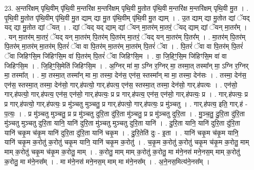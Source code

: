 \documentclass[17pt]{extarticle}
\begin{document}
23. अ॒न्तरि॑क्षम् पृथि॒वीम् पृ॑थि॒वी म॒न्तरि॑क्ष म॒न्तरि॑क्षम् पृथि॒वी मु॒तोत पृ॑थि॒वी म॒न्तरि॑क्ष म॒न्तरि॑क्षम् पृथि॒वी मु॒त । . पृ॒थि॒वी मु॒तोत पृ॑थि॒वीम् पृ॑थि॒वी मु॒त द्याम् द्या मु॒त पृ॑थि॒वीम् पृ॑थि॒वी मु॒त द्याम् । . उ॒त द्याम् द्या मु॒तोत द्यां ॅयद् यद् द्या मु॒तोत द्यां ॅयत् । . द्यां ॅयद् यद् द्याम् द्यां ॅयन् मा॒तर॑म् मा॒तरं॒ ॅयद् द्याम् द्यां ॅयन् मा॒तर᳚म् । . यन् मा॒तर॑म् मा॒तरं॒ ॅयद् यन् मा॒तर॑म् पि॒तर॑म् पि॒तर॑म् मा॒तरं॒ ॅयद् यन् मा॒तर॑म् पि॒तर᳚म् । . मा॒तर॑म् पि॒तर॑म् पि॒तर॑म् मा॒तर॑म् मा॒तर॑म् पि॒तरं॑ ॅवा वा पि॒तर॑म् मा॒तर॑म् मा॒तर॑म् पि॒तरं॑ ॅवा । . पि॒तरं॑ ॅवा वा पि॒तर॑म् पि॒तरं॑ ॅवा जिहिꣳसि॒म जि॑हिꣳसि॒म वा॑ पि॒तर॑म् पि॒तरं॑ ॅवा जिहिꣳसि॒म । . वा॒ जि॒हिꣳ॒॒सि॒म जि॑हिꣳसि॒म वा॑ वा जिहिꣳसि॒म । . जि॒हिꣳ॒॒सि॒मेति॑ जिहिꣳसि॒म । . अ॒ग्निर् मा॑ मा॒ ऽग्नि र॒ग्निर् मा॒ तस्मा॒त् तस्मा᳚न् मा॒ ऽग्नि र॒ग्निर् मा॒ तस्मा᳚त् । . मा॒ तस्मा॒त् तस्मा᳚न् मा मा॒ तस्मा॒ देन॑स॒ एन॑स॒ स्तस्मा᳚न् मा मा॒ तस्मा॒ देन॑सः । . तस्मा॒ देन॑स॒ एन॑स॒ स्तस्मा॒त् तस्मा॒ देन॑सो॒ गार्.ह॑पत्यो॒ गार्.ह॑पत्य॒ एन॑स॒ स्तस्मा॒त् तस्मा॒ देन॑सो॒ गार्.ह॑पत्यः । . एन॑सो॒ गार्.ह॑पत्यो॒ गार्.ह॑पत्य॒ एन॑स॒ एन॑सो॒ गार्.ह॑पत्यः॒ प्र प्र गार्.ह॑पत्य॒ एन॑स॒ एन॑सो॒ गार्.ह॑पत्यः॒ प्र । . गार्.ह॑पत्यः॒ प्र प्र गार्.ह॑पत्यो॒ गार्.ह॑पत्यः॒ प्र मु॑ञ्चतु मुञ्चतु॒ प्र गार्.ह॑पत्यो॒ गार्.ह॑पत्यः॒ प्र मु॑ञ्चतु । . गार्.ह॑पत्य॒ इति॒ गार्.ह॑ - प॒त्यः॒ । . प्र मु॑ञ्चतु मुञ्चतु॒ प्र प्र मु॑ञ्चतु दुरि॒ता दु॑रि॒ता मु॑ञ्चतु॒ प्र प्र मु॑ञ्चतु दुरि॒ता । . मु॒ञ्च॒तु॒ दु॒रि॒ता दु॑रि॒ता मु॑ञ्चतु मुञ्चतु दुरि॒ता यानि॒ यानि॑ दुरि॒ता मु॑ञ्चतु मुञ्चतु दुरि॒ता यानि॑ । . दु॒रि॒ता यानि॒ यानि॑ दुरि॒ता दु॑रि॒ता यानि॑ चकृ॒म च॑कृ॒म यानि॑ दुरि॒ता दु॑रि॒ता यानि॑ चकृ॒म । . दु॒रि॒तेति॑ दुः - इ॒ता । . यानि॑ चकृ॒म च॑कृ॒म यानि॒ यानि॑ चकृ॒म क॒रोतु॑ क॒रोतु॑ चकृ॒म यानि॒ यानि॑ चकृ॒म क॒रोतु॑ । . च॒कृ॒म क॒रोतु॑ क॒रोतु॑ चकृ॒म च॑कृ॒म क॒रोतु॒ माम् माम् क॒रोतु॑ चकृ॒म च॑कृ॒म क॒रोतु॒ माम् । . क॒रोतु॒ माम् माम् क॒रोतु॑ क॒रोतु॒ मा म॑ने॒नस॑ मने॒नस॒म् माम् क॒रोतु॑ क॒रोतु॒ मा म॑ने॒नस᳚म् । . मा म॑ने॒नस॑ मने॒नस॒म् माम् मा म॑ने॒नस᳚म् । . अ॒ने॒नस॒मित्य॑ने॒नस᳚म् । \newline
\pagebreak
{}
\end{document}
